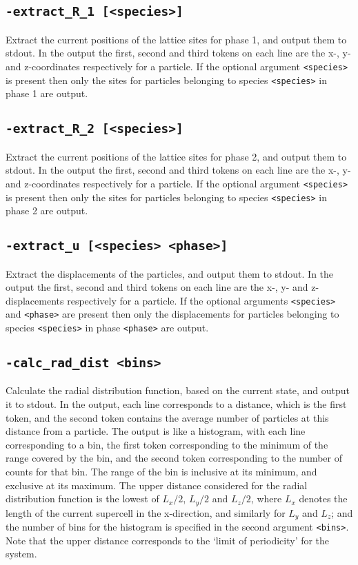 \documentclass{report}
\begin{document}
\subsection{\texttt{-extract\_R\_1 [<species>]}}
Extract the current positions of the lattice sites for phase 1, and output them to stdout. In the output the first, second and third 
tokens on each line are the x-, y- and z-coordinates respectively for a particle. If the optional argument \texttt{<species>} is present 
then only the sites for particles belonging to species \texttt{<species>} in phase 1 are output.

\subsection{\texttt{-extract\_R\_2 [<species>]}}
Extract the current positions of the lattice sites for phase 2, and output them to stdout. In the output the first, second and third 
tokens on each line are the x-, y- and z-coordinates respectively for a particle. If the optional argument \texttt{<species>} is present 
then only the sites for particles belonging to species \texttt{<species>} in phase 2 are output.

\subsection{\texttt{-extract\_u [<species> <phase>]}}
Extract the displacements of the particles, and output them to stdout. In the output the first, second and third tokens on each line are 
the x-, y- and z-displacements respectively for a particle. If the optional arguments \texttt{<species>} and \texttt{<phase>} are present 
then only the displacements for particles belonging to species \texttt{<species>} in phase \texttt{<phase>} are output.

\subsection{\texttt{-calc\_rad\_dist <bins>}}
Calculate the radial distribution function, based on the current state, and output it to stdout. In the output, each line corresponds 
to a distance, which is the first token, and the second token contains the average number of particles at this distance from a particle. The 
output is like a histogram, with each line corresponding to a bin, the first token corresponding to the minimum of the range covered by the 
bin, and the second token corresponding to the number of counts for that bin. The range of the bin is inclusive at its minimum, and 
exclusive at its maximum. The upper distance considered for the radial distribution function is the lowest of $L_x/2$, $L_y/2$ and $L_z/2$,
where $L_x$ denotes the length of the current supercell in the x-direction, and similarly for $L_y$ and $L_z$; and the number of bins for 
the histogram is specified in the second argument \texttt{<bins>}. Note that the upper distance corresponds to the `limit of periodicity' for the system. 
\end{document}

